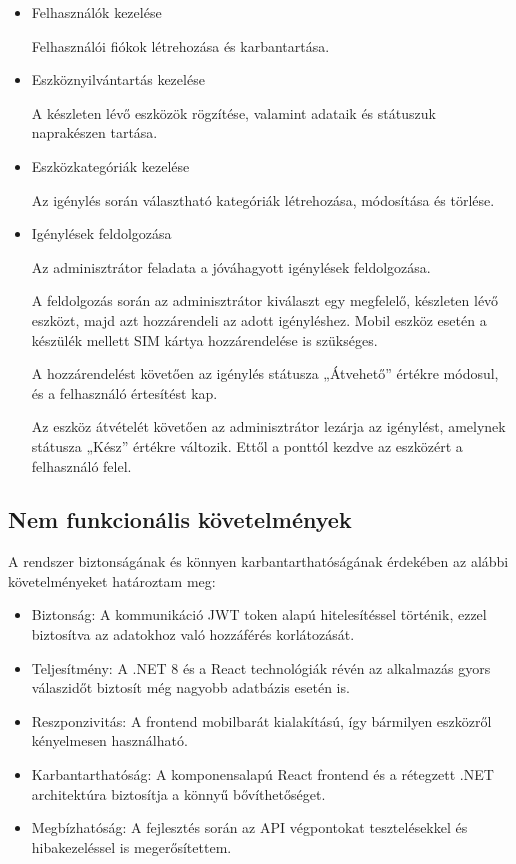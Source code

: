 \documentclass[
]{thesis-ekf}
\theoremstyle{definition}
\theoremstyle{remark}
\begin{document}
\begin{itemize}
	\item Felhasználók kezelése
	
	Felhasználói fiókok létrehozása és karbantartása.
	
	\item Eszköznyilvántartás kezelése
	
	A készleten lévő eszközök rögzítése, valamint adataik és státuszuk naprakészen tartása.
	
	\item Eszközkategóriák kezelése
	
	Az igénylés során választható kategóriák létrehozása, módosítása és törlése.
	
	\item Igénylések feldolgozása
	
	Az adminisztrátor feladata a jóváhagyott igénylések feldolgozása.
	
	A feldolgozás során az adminisztrátor kiválaszt egy megfelelő, készleten lévő eszközt, majd azt hozzárendeli az adott igényléshez. Mobil eszköz esetén a készülék mellett SIM kártya hozzárendelése is szükséges.
	
	A hozzárendelést követően az igénylés státusza „Átvehető” értékre módosul, és a felhasználó értesítést kap.
	
	Az eszköz átvételét követően az adminisztrátor lezárja az igénylést, amelynek státusza „Kész” értékre változik. Ettől a ponttól kezdve az eszközért a felhasználó felel.
	
	
\end{itemize}

\subsection{Nem funkcionális követelmények}

A rendszer biztonságának és könnyen karbantarthatóságának érdekében az alábbi követelményeket határoztam meg:

\begin{itemize}
	\item Biztonság: A kommunikáció JWT token alapú hitelesítéssel történik, ezzel biztosítva az adatokhoz való hozzáférés korlátozását.
	\item Teljesítmény: A .NET 8 és a React technológiák révén az alkalmazás gyors válaszidőt biztosít még nagyobb adatbázis esetén is.
	\item Reszponzivitás: A frontend mobilbarát kialakítású, így bármilyen eszközről kényelmesen használható.
	\item Karbantarthatóság: A komponensalapú React frontend és a rétegzett .NET architektúra biztosítja a könnyű bővíthetőséget.
	\item Megbízhatóság: A fejlesztés során az API végpontokat tesztelésekkel és hibakezeléssel is megerősítettem.
\end{itemize}
\end{document}
